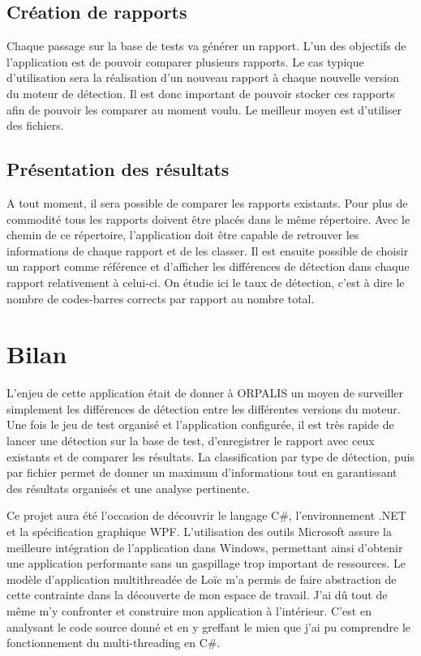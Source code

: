 \subsection{Création de rapports}

Chaque passage sur la base de tests va générer un rapport. L'un des objectifs de l'application est de pouvoir comparer plusieurs rapports. Le cas typique d'utilisation sera la réalisation d'un nouveau rapport à chaque nouvelle version du moteur de détection. Il est donc important de pouvoir stocker ces rapports afin de pouvoir les comparer au moment voulu. Le meilleur moyen est d'utiliser des fichiers.

\subsection{Présentation des résultats}

A tout moment, il sera possible de comparer les rapports existants. Pour plus de commodité tous les rapports doivent être placés dans le même répertoire. Avec le chemin de ce répertoire, l'application doit être capable de retrouver les informations de chaque rapport et de les classer. Il est ensuite possible de choisir un rapport comme référence et d'afficher les différences de détection dans chaque rapport relativement à celui-ci. On étudie ici le taux de détection, c'est à dire le nombre de codes-barres corrects par rapport au nombre total.


\section{Bilan}

L'enjeu de cette application était de donner à ORPALIS un moyen de surveiller simplement les différences de détection entre les différentes versions du moteur. Une fois le jeu de test organisé et l'application configurée, il est très rapide de lancer une détection sur la base de test, d'enregistrer le rapport avec ceux existants et de comparer les résultats. La classification par type de détection, puis par fichier permet de donner un maximum d'informations tout en garantissant des résultats organisés et une analyse pertinente.

Ce projet aura été l'occasion de découvrir le langage C\#, l'environnement .NET et la spécification graphique WPF. L'utilisation des outils Microsoft assure la meilleure intégration de l'application dans Windows, permettant ainsi d'obtenir une application performante sans un gaspillage trop important de ressources. Le modèle d'application multithreadée de Loïc m'a permis de faire abstraction de cette contrainte dans la découverte de mon espace de travail. J'ai dû tout de même m'y confronter et construire mon application à l'intérieur. C'est en analysant le code source donné et en y greffant le mien que j'ai pu comprendre le fonctionnement du multi-threading en C\#.